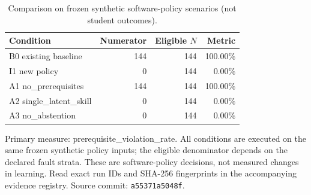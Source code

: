 \begin{table}[htbp]
\centering
\small
\caption{Comparison on frozen synthetic software-policy scenarios (not student outcomes).}
\label{tab:ln-02-policy-benchmark}
\begin{tabular}{lrrr}
\toprule
Condition & Numerator & Eligible $N$ & Metric \\
\midrule
B0 existing baseline & 144 & 144 & 100.00\% \\
I1 new policy & 0 & 144 & 0.00\% \\
A1 no\_prerequisites & 144 & 144 & 100.00\% \\
A2 single\_latent\_skill & 0 & 144 & 0.00\% \\
A3 no\_abstention & 0 & 144 & 0.00\% \\
\bottomrule
\end{tabular}
\par\smallskip
\begin{minipage}{0.98\linewidth}\footnotesize
Primary measure: prerequisite\_violation\_rate. All conditions are executed on the same frozen synthetic policy inputs; the eligible denominator depends on the declared fault strata. These are software-policy decisions, not measured changes in learning. Read exact run IDs and SHA-256 fingerprints in the accompanying evidence registry. Source commit: \texttt{a55371a5048f}.
\end{minipage}
\end{table}
